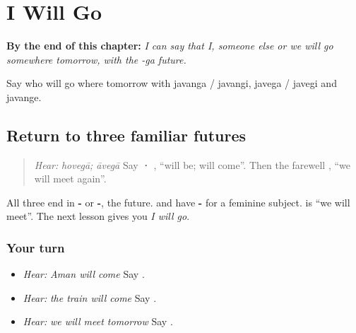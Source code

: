 
\chapter{I Will Go}
\label{ch:pa-a2-javanga}

\begin{chapteropening}
\textbf{By the end of this chapter:} \emph{I can say that I, someone else or we will go somewhere tomorrow, with the -ga future.}

Say who will go where tomorrow with javanga / javangi, javega / javegi and javange.
\end{chapteropening}

\section[\texorpdfstring{\pa{ਹੋਵੇਗਾ} · \pa{ਆਵੇਗਾ} … (hovegā · āvegā …)}{ਹੋਵੇਗਾ · ਆਵੇਗਾ … (hovegā · āvegā …)}]{Return to three familiar futures}

\label{lesson:PA-C221-future-return}



\begin{quote}
\emph{Hear:} \emph{hovegā; āvegā} Say \textbf{ · }, \textquotedblleft{}will be; will come\textquotedblright{}. Then the farewell \textbf{ }, \textquotedblleft{}we will meet again\textquotedblright{}.
\end{quote}

\begin{grammarlens}[title={Grammar Lens}]
All three end in \textbf{-} or \textbf{-}, the future. \textbf{} and \textbf{} have \textbf{-} for a feminine subject. \textbf{} is \textquotedblleft{}we will meet\textquotedblright{}. The next lesson gives you \emph{I will go}.
\end{grammarlens}

\subsection*{Your turn}
\begin{itemize}
\raggedright
  \item \emph{Hear:} \emph{Aman will come} Say \textbf{ }.
  \item \emph{Hear:} \emph{the train will come} Say \textbf{ }.
  \item \emph{Hear:} \emph{we will meet tomorrow} Say \textbf{ }.
\end{itemize}

